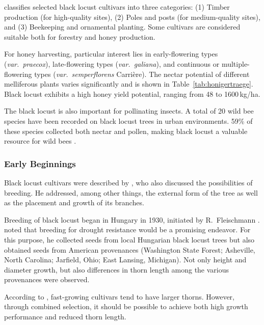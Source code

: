 \citet{keresztesi1983robinie} classifies selected black locust cultivars into three categories:  
(1) Timber production (for high-quality sites),  
(2) Poles and posts (for medium-quality sites), and  
(3) Beekeeping and ornamental planting.  
Some cultivars are considered suitable both for forestry and honey production.

For honey harvesting, particular interest lies in early-flowering types  
(\emph{var.\ praecox}), late-flowering types (\emph{var.\ galiana}), and continuous or multiple-flowering types (\emph{var.\ semperflorens} Carrière).  
The nectar potential of different melliferous plants varies significantly and is shown in Table~\ref{tab:honigertraege}.  
Black locust exhibits a high honey yield potential, ranging from 48 to 1600\,kg/ha.


The black locust is also important for pollinating insects.  
A total of 20 wild bee species have been recorded on black locust trees in urban environments.  
59\% of these species collected both nectar and pollen, making black locust a valuable resource for wild bees \citep{hausmann2016bienen}.


\subsubsection{Early Beginnings}

Black locust cultivars were described by \citet{vilmos1908robiniensorten}, who also discussed the possibilities of breeding. He addressed, among other things, the external form of the tree as well as the placement and growth of its branches.

Breeding of black locust began in Hungary in 1930, initiated by R.~Fleischmann \citep{keresztesi1983robinie}. \citet{fleischmann1933robinie} noted that breeding for drought resistance would be a promising endeavor. For this purpose, he collected seeds from local Hungarian black locust trees but also obtained seeds from American provenances (Washington State Forest; Asheville, North Carolina; Jarfield, Ohio; East Lansing, Michigan). Not only height and diameter growth, but also differences in thorn length among the various provenances were observed.

According to \citet{bloes1992robinie,mebrahtu1989robinie}, fast-growing cultivars tend to have larger thorns. However, through combined selection, it should be possible to achieve both high growth performance and reduced thorn length.

